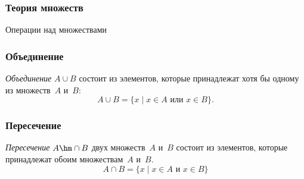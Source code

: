 \begin{frame}
\frametitle{Теория множеств}

\begin{center}

\Huge
Операции над множествами
	
\end{center}


\end{frame}

\begin{frame}
\frametitle{Объединение}

\emph{Объединение}
$A\cup B$\index{$\cup$} состоит из элементов, которые принадлежат хотя
бы одному из множеств~$A$ и~$B$:
        $$
A \cup B = \{ x\mid x\in A \text{ или } x\in B\}.
        $$

\begin{center}
\end{center}

\end{frame}


\begin{frame}
\frametitle{Пересечение}

\emph{Пересечение}
$A\hm\cap B$\index{$\cap$} двух множеств~$A$ и~$B$
состоит из элементов, которые принадлежат обоим множествам~$A$
и~$B$. 
        $$
A \cap B = \{ x\mid x\in A \text{ и } x\in B\}
        $$

\begin{center}

\end{center}

\end{frame}


